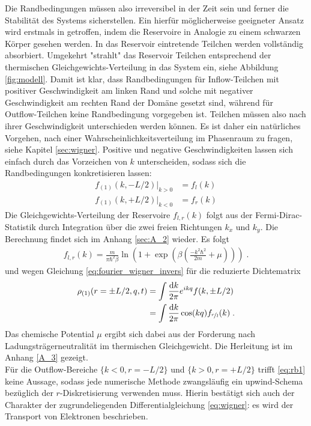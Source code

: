 Die Randbedingungen müssen also irreversibel in der Zeit sein und ferner die Stabilität des Systems sicherstellen. Ein hierfür möglicherweise geeigneter Ansatz wird erstmals in \cite{frensley2} getroffen, indem die Reservoire in Analogie zu einem schwarzen Körper gesehen werden. In das Reservoir eintretende Teilchen werden vollständig absorbiert. Umgekehrt "strahlt" das Reservoir Teilchen entsprechend der thermischen Gleichgewichts-Verteilung in das System ein, siehe Abbildung \ref{fig:modell}.
Damit ist klar, dass Randbedingungen für Inflow-Teilchen mit positiver Geschwindigkeit am linken Rand und solche mit negativer Geschwindigkeit am rechten Rand der Domäne gesetzt sind, während für Outflow-Teilchen keine Randbedingung vorgegeben ist. Teilchen müssen also nach ihrer Geschwindigkeit unterschieden werden können.
Es ist daher ein natürliches Vorgehen, nach einer Wahrscheinlichkeitsverteilung im Phasenraum zu fragen, siehe Kapitel \ref{sec:wigner}.
Positive und negative Geschwindigkeiten lassen sich einfach durch das Vorzeichen von $k$ unterscheiden, sodass sich die Randbedingungen konkretisieren lassen:
\begin{equation}
  \begin{aligned}
    f_{(1)}(k,-L/2)|_{k>0} &= f_l({k}) \\
    f_{(1)}(k,+L/2)|_{k<0} &= f_r({k})
  \end{aligned}
  \label{eq:rb1}
\end{equation}
Die Gleichgewichts-Verteilung der Reservoire $f_{l,r}(k)$ folgt aus der Fermi-Dirac-Statistik durch Integration über die zwei freien Richtungen $k_x$ und $k_y$. Die Berechnung findet sich im Anhang \ref{sec:A_2} wieder. Es folgt
\begin{align}
  f_{l,r} (k) = \frac{m}{\pi\hbar^2\beta} \ln(1+\exp(\beta(\frac{- k^2\hbar^2}{2m} + \mu))) \; .
  \label{eq:rb2}
\end{align}
und wegen Gleichung \eqref{eq:fourier_wigner_invers} für die reduzierte Dichtematrix
\begin{equation}
  \begin{aligned}
    \rho_{(1)}(r=\pm L/2, q, t) &= \int \frac{\mathop{}\!\mathrm{d} k}{2\pi} e^{ikq} f(k,\pm L/2) \\
                                &= \int \frac{\mathop{}\!\mathrm{d} k}{2\pi} \cos(kq) f_{\nicefrac{r}{l}} (k) \; .
  \end{aligned}
\end{equation}
Das chemische Potential $\mu$ ergibt sich dabei aus der Forderung nach Ladungsträgerneutralität im thermischen Gleichgewicht. Die Herleitung ist im Anhang \ref{A_3} gezeigt.\\
Für die Outflow-Bereiche $\{ k<0, r=-L/2 \}$ und $\{ k>0, r=+L/2 \}$ trifft \eqref{eq:rb1} keine Aussage, sodass jede numerische Methode zwangsläufig ein upwind-Schema bezüglich der $r$-Diskretisierung verwenden muss. Hierin bestätigt sich auch der Charakter der zugrundeliegenden Differentialgleichung \eqref{eq:wigner}: es wird der Transport von Elektronen beschrieben.

